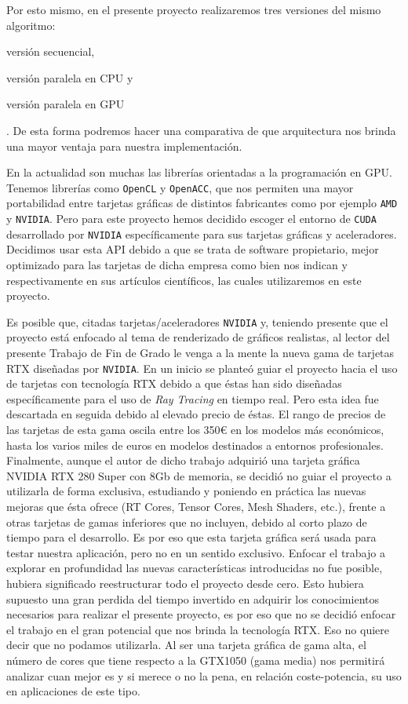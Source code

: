 \documentclass[titlepage,12pt]{report}
\begin{document}
Por esto mismo, en el presente proyecto realizaremos tres versiones del mismo algoritmo: \begin{enumerate*}[label=\roman*)] \item versión secuencial, \item versión paralela en CPU y \item versión paralela en GPU \end{enumerate*}. De esta forma podremos hacer una comparativa de que arquitectura nos brinda una mayor ventaja para nuestra implementación.

En la actualidad son muchas las librerías orientadas a la programación en GPU. Tenemos librerías como \texttt{OpenCL} y \texttt{OpenACC}, que nos permiten una mayor portabilidad entre tarjetas gráficas de distintos fabricantes como por ejemplo \texttt{AMD} y \texttt{NVIDIA}. Pero para este proyecto hemos decidido escoger el entorno de \texttt{CUDA} desarrollado por \texttt{NVIDIA} específicamente para sus tarjetas gráficas y aceleradores. Decidimos usar esta API debido a que se trata de software propietario, mejor optimizado para las tarjetas de dicha empresa como bien nos indican \citep{Karimi2010} y \citep{Fang2011} respectivamente en sus artículos científicos, las cuales utilizaremos en este proyecto.

Es posible que, citadas tarjetas/aceleradores \texttt{NVIDIA} y, teniendo presente que el proyecto está enfocado al tema de renderizado de gráficos realistas, al lector del presente Trabajo de Fin de Grado le venga a la mente la nueva gama de tarjetas RTX diseñadas por \texttt{NVIDIA}. En un inicio se planteó guiar el proyecto hacia el uso de tarjetas con tecnología RTX debido a que éstas han sido diseñadas específicamente para el uso de \textit{Ray Tracing} en tiempo real. Pero esta idea fue descartada en seguida debido al elevado precio de éstas. El rango de precios de las tarjetas de esta gama oscila entre los 350€ en los modelos más económicos, hasta los varios miles de euros en modelos destinados a entornos profesionales. Finalmente, aunque el autor de dicho trabajo adquirió una tarjeta gráfica NVIDIA RTX 280 Super con 8Gb de memoria, se decidió no guiar el proyecto a utilizarla de forma exclusiva, estudiando y poniendo en práctica las nuevas mejoras que ésta ofrece (RT Cores, Tensor Cores, Mesh Shaders, etc.), frente a otras tarjetas de gamas inferiores que no incluyen, debido al corto plazo de tiempo para el desarrollo. Es por eso que esta tarjeta gráfica será usada para testar nuestra aplicación, pero no en un sentido exclusivo. Enfocar el trabajo a explorar en profundidad las nuevas características introducidas no fue posible, hubiera significado reestructurar todo el proyecto desde cero. Esto hubiera supuesto una gran perdida del tiempo invertido en adquirir los conocimientos necesarios para realizar el presente proyecto, es por eso que no se decidió enfocar el trabajo en el gran potencial que nos brinda la tecnología RTX. Eso no quiere decir que no podamos utilizarla. Al ser una tarjeta gráfica de gama alta, el número de cores que tiene respecto a la GTX1050 (gama media) nos permitirá analizar cuan mejor es y si merece o no la pena, en relación coste-potencia, su uso en aplicaciones de este tipo.
\end{document}
